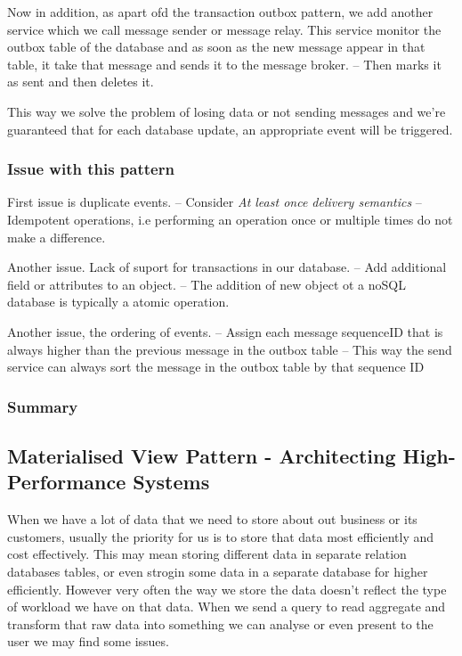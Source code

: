 \documentclass[a4paper, 11pt]{book}
\begin{document}
    Now in addition, as apart ofd the transaction outbox pattern, we add another service which we call message sender or message relay.
    This service monitor the outbox table of the database and as soon as the new message appear in that table, it take that message and sends it to the message broker.
    -- Then marks it as sent and then deletes it.

    This way we solve the problem of losing data or not sending messages and we're guaranteed that for each database update, an appropriate event will be triggered.

    \subsubsection{Issue with this pattern}
    First issue is duplicate events.
    -- Consider \textit{At least once delivery semantics}
    -- Idempotent operations, i.e performing an operation once or multiple times do not make a difference.

    Another issue. Lack of suport for transactions in our database.
    -- Add additional field or attributes to an object.
    -- The addition of new object ot a noSQL database is typically a atomic operation.

    Another issue, the ordering of events.
    -- Assign each message sequenceID that is always higher than the previous message in the outbox table
    -- This way the send service can always sort the message in the outbox table by that sequence ID

    \subsubsection{Summary}

    \subsection{Materialised View Pattern - Architecting High-Performance Systems}
    When we have a lot of data that we need to store about out business or its customers, usually the priority for us is to store that data most efficiently and cost effectively.
    This may mean storing different data in separate relation databases tables, or even strogin some data in a separate database for higher efficiently.
    However very often the way we store the data doesn't reflect the type of workload we have on that data.
    When we send a query to read aggregate and transform that raw data into something we can analyse or even present to the user we may find some issues.
\end{document}
